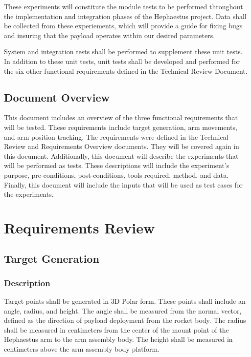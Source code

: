 \documentclass[letterpaper,10pt]{article}
\begin{document}
These experiments will constitute the module tests to be performed throughout 
the implementation and integration phases of the Hephaestus project. Data shall 
be collected from these experiements, which will provide a guide for fixing bugs 
and insuring that the payload operates within our desired parameters. 

System and integration tests shall be performed to supplement these unit tests. 
In addition to these unit tests, unit tests shall be developed and performed for 
the six other functional requirements defined in the Technical Review Document.

\subsection{Document Overview}
This document includes an overview of the three functional requirements that
will be tested. These requirements include target generation, arm movements, and 
arm position tracking. The requirements were defined in the Technical Review 
and Requirements Overview documents. They will be covered again in this
document. Additionally, this document will describe the experiments that will be 
performed as tests. These descriptions will include the experiment's purpose, 
pre-conditions, post-conditions, tools required, method, and data. Finally, this 
document will include the inputs that will be used as test cases for the 
experiments.

\section{Requirements Review}

\subsection{Target Generation}
\subsubsection{Description}
Target points shall be generated in 3D Polar form. These points shall include an 
angle, radius, and height. The angle shall be measured from the normal vector, 
defined as the direction of payload deployment from the rocket body. The radius 
shall be measured in centimeters from the center of the mount point of the 
Hephaestus arm to the arm assembly body. The height shall be measured in 
centimeters above the arm assembly body platform.
\end{document}

